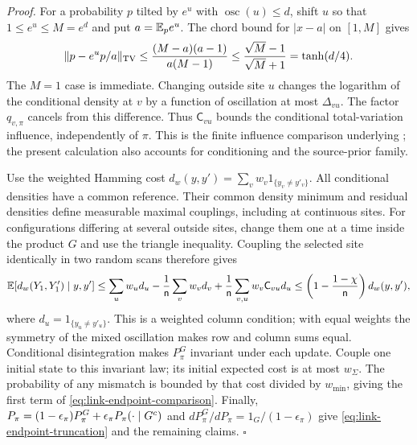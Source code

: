 \noindent\emph{Proof.}
For a probability $p$ tilted by $e^u$ with $\operatorname{osc}(u)\le d$, shift
$u$ so that $1\le e^u\le M=e^d$ and put $a=\mathbb E_p e^u$. The chord bound for
$|x-a|$ on $[1,M]$ gives
\begin{equation}
\|p-e^up/a\|_{\rm TV}
\le\frac{(M-a)(a-1)}{a(M-1)}
\le\frac{\sqrt M-1}{\sqrt M+1}=\tanh(d/4).
\end{equation}
The $M=1$ case is immediate. Changing outside site $u$ changes the logarithm of
the conditional density at $v$ by a function of oscillation at most
$\Delta_{vu}$. The factor $q_{v,\pi}$ cancels from this difference. Thus
$\mathsf C_{vu}$ bounds the conditional total-variation influence, independently
of $\pi$. This is the finite influence comparison underlying
\citet[Corollary~2.6]{RebeschiniVanHandel2013}; the present calculation also
accounts for conditioning and the source-prior family.

Use the weighted Hamming cost $d_w(y,y')=\sum_vw_v1_{\{y_v\ne y'_v\}}$. All conditional
densities have a common reference. Their common density minimum and residual
densities define measurable maximal couplings, including at continuous sites.
For configurations differing at several outside sites, change them one at a time
inside the product $G$ and use the triangle inequality. Coupling the selected
site identically in two random scans therefore gives
\begin{equation}
\mathbb E[d_w(Y_1,Y'_1)\mid y,y']
\le\sum_uw_ud_u-\frac1{\mathsf n}\sum_vw_vd_v
+\frac1{\mathsf n}\sum_{v,u}w_v\mathsf C_{vu}d_u
\le\left(1-\frac{1-\chi}{\mathsf n}\right)d_w(y,y'),
\end{equation}
where $d_u=1_{\{y_u\ne y'_u\}}$. This is a weighted column condition; with equal
weights the symmetry of the mixed oscillation makes row and column sums equal.
Conditional disintegration makes
$P_\pi^G$ invariant under each update. Couple one initial state to this invariant
law; its initial expected cost is at most $w_\Sigma$. The probability
of any mismatch is bounded by that cost divided by $w_{\min}$, giving the first term of
\cref{eq:link-endpoint-comparison}. Finally,
$P_\pi=(1-\epsilon_\pi)P_\pi^G+\epsilon_\pi P_\pi(\cdot\mid G^c)$ and
$dP_\pi^G/dP_\pi=1_G/(1-\epsilon_\pi)$ give
\cref{eq:link-endpoint-truncation} and the remaining claims. $\square$

